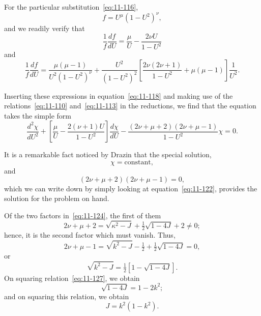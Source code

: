 For the particular substitution~\eqref{eq:11-116},
\begin{equation}
\label{eq:11-119}
f = U^{\mu}(1-U^2)^{\nu},
\end{equation}
and we readily verify that
\begin{equation}
\label{eq:11-120}
\frac{1}{f}\frac{df}{dU} = \frac{\mu}{U}-\frac{2\nu U}{1-U^2}
\end{equation}
and
\begin{equation}
\label{eq:11-121}
\frac{1}{f}\frac{df}{dU} = \frac{\mu(\mu-1)}{U^2(1-U^2)^{\nu}}+\frac{U^2}{(1-U^2)^2}\!\left[\frac{2\nu(2\nu+1)}{1-U^2}+\mu(\mu-1)\right]\frac{1}{U^2}.
\end{equation}

Inserting these expressions in equation~\eqref{eq:11-118} and making use of the relations~\eqref{eq:11-110} and~\eqref{eq:11-113} in the reductions, we find that the equation takes the simple form
\begin{equation}
\label{eq:11-122}
\frac{d^2\chi}{dU^2}+\left[\frac{\mu}{U}-\frac{2(\nu+1)U}{1-U^2}\right]\frac{d\chi}{dU}-\frac{(2\nu+\mu+2)(2\nu+\mu-1)}{1-U^2}\chi = 0.
\end{equation}

It is a remarkable fact noticed by Drazin that the special solution,
\begin{equation}
\label{eq:11-123}
\chi = \text{constant},
\end{equation}
and
\begin{equation}
\label{eq:11-124}
(2\nu+\mu+2)(2\nu+\mu-1) = 0,
\end{equation}
which we can write down by simply looking at equation~\eqref{eq:11-122}, provides the solution for the problem on hand.

Of the two factors in~\eqref{eq:11-124}, the first of them
\begin{equation}
\label{eq:11-125}
2\nu+\mu+2 = \sqrt{\kappa^2-J}+\tfrac{1}{2}\sqrt{1-4J}+2 \neq 0;
\end{equation}
hence, it is the second factor which must vanish. Thus,
\begin{equation}
\label{eq:11-126}
2\nu+\mu-1 = \sqrt{k^2-J}-\tfrac{1}{2}+\tfrac{1}{2}\sqrt{1-4J} = 0,
\end{equation}
or
\begin{equation}
\label{eq:11-127}
\sqrt{k^2-J} = \tfrac{1}{2}\!\left[1-\sqrt{1-4J}\right]\!.
\end{equation}
On squaring relation~\eqref{eq:11-127}, we obtain
\begin{equation}
\label{eq:11-128}
\sqrt{1-4J} = 1-2k^2;
\end{equation}
and on squaring this relation, we obtain
\begin{equation}
\label{eq:11-129}
J = k^2(1-k^2).
\end{equation}

